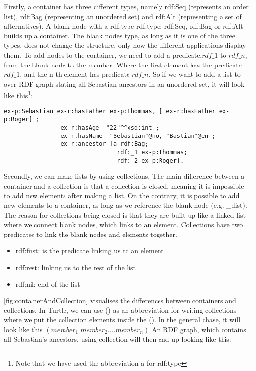 \para
Firstly, a container has three different types, namely rdf:Seq (represents an order list), rdf:Bag (representing an unordered set) and rdf:Alt (representing a set of alternatives). A blank node with a rdf:type rdf:type; rdf:Seq, rdf:Bag or rdf:Alt builds up a container. The blank nodes type, as long as it is one of the three types, does not change the structure, only how the different applications display them.  To add nodes to the container, we need to add a predicate,$rdf\_1$ to $rdf\_n$, from the blank node to the member. Where the first element has the predicate $rdf\_1$, and the n-th element has predicate $rdf\_n$. So if we want to add a list to over RDF graph stating all Sebastian ancestors in an unordered set, 
it will look like this\footnote{Note that we have used the abbreviation a for rdf:type}:
\begin{lstlisting}[frame=single, language=turtle]
ex-p:Sebastian ex-r:hasFather ex-p:Thommas, [ ex-r:hasFather ex-p:Roger] ; 
                ex-r:hasAge  "22"^^xsd:int ; 
                ex-r:hasName  "Sebastian"@no, "Bastian"@en ;
                ex-r:ancestor [a rdf:Bag; 
                                rdf:_1 ex-p:Thommas; 
                                rdf:_2 ex-p:Roger].
\end{lstlisting}
Secondly, we can make lists by using collections. The main difference between a container and a collection is that a collection is closed, meaning it is impossible to add new elements after making a list. On the contrary, it is possible to add new elements to a container, as long as we reference the blank node (e.g. \_:list). The reason for collections being closed is that they are built up like a linked list where we connect blank nodes, which links to an element. Collections have two predicates to link the blank nodes and elements together. 

\begin{itemize}
    \item rdf:first: is the predicate linking us to an element
    \item rdf:rest: linking us to the rest of the list
    \item rdf:nil: end of the list
\end{itemize}
\autoref{fig:containerAndCollection} visualises the differences between containers and collections. In Turtle, we can use () as an abbreviation for writing collections where we put the collection elements inside the (). In the general chase, it will look like this $(member_1 \;member_2 .... member_n)$ An RDF graph, which contains all Sebastian's ancestors, using collection will then end up looking like this:

